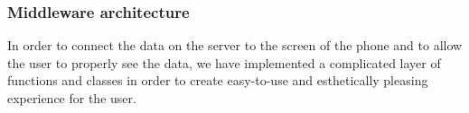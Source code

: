 \subsubsection{Middleware architecture}
In order to connect the data on the server to the screen of the phone and to allow the user to properly see the data, we have implemented a complicated layer of functions and classes in order to create easy-to-use and esthetically pleasing experience for the user.

